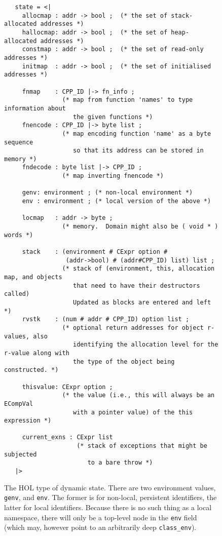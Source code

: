 \documentclass[11pt]{article}
\begin{document}
\begin{figure}[htbp]
\footnotesize
\begin{verbatim}
   state = <|
     allocmap : addr -> bool ;  (* the set of stack-allocated addresses *)
     hallocmap: addr -> bool ;  (* the set of heap-allocated addresses *)
     constmap : addr -> bool ;  (* the set of read-only addresses *)
     initmap  : addr -> bool ;  (* the set of initialised addresses *)

     fnmap    : CPP_ID |-> fn_info ;
                (* map from function 'names' to type information about
                   the given functions *)
     fnencode : CPP_ID |-> byte list ;
                (* map encoding function 'name' as a byte sequence
                   so that its address can be stored in memory *)
     fndecode : byte list |-> CPP_ID ;
                (* map inverting fnencode *)

     genv: environment ; (* non-local environment *)
     env : environment ; (* local version of the above *)

     locmap   : addr -> byte ;
                (* memory.  Domain might also be ( void * ) words *)

     stack    : (environment # CExpr option #
                 (addr->bool) # (addr#CPP_ID) list) list ;
                (* stack of (environment, this, allocation map, and objects
                   that need to have their destructors called)
                   Updated as blocks are entered and left *)
     rvstk    : (num # addr # CPP_ID) option list ;
                (* optional return addresses for object r-values, also
                   identifying the allocation level for the r-value along with
                   the type of the object being constructed. *)

     thisvalue: CExpr option ;
                (* the value (i.e., this will always be an ECompVal
                   with a pointer value) of the this expression *)

     current_exns : CExpr list
                    (* stack of exceptions that might be subjected
                       to a bare throw *)
   |>
\end{verbatim}
\caption[The HOL Type of Dynamic State]{The HOL type of dynamic state.
  There are two environment values, \texttt{genv}, and \texttt{env}.
  The former is for non-local, persistent identifiers, the latter for
  local identifiers.  Because there is no such thing as a local
  namespace, there will only be a top-level node in the \texttt{env}
  field (which may, however point to an arbitrarily deep
  \texttt{class_env}).}
\label{fig:state-type}
\end{figure}
\end{document}
